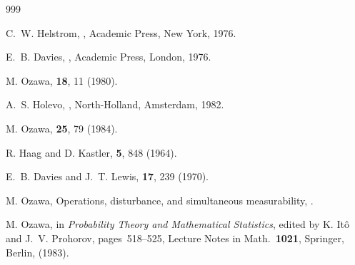 \begin{thebibliography}{999}

C.~W. Helstrom,
,
\newblock Academic Press, New York, 1976.

E.~B. Davies,
,
\newblock Academic Press, London, 1976.

M. Ozawa,
 {\bf 18}, 11 (1980).

A.~S. Holevo,
,
\newblock North-Holland, Amsterdam, 1982.

M. Ozawa,
 {\bf 25}, 79 (1984).

R. Haag and D. Kastler,
 {\bf 5}, 848 (1964).

E.~B. Davies and J.~T. Lewis,
 {\bf 17}, 239 (1970).

M. Ozawa,
\newblock Operations, disturbance, and simultaneous measurability,
.

M. Ozawa,
\newblock in  {\it Probability Theory
  and Mathematical Statistics}, edited by K. It\^{o} and J.~V. Prohorov,
pages~518--525,
Lecture Notes in Math.\ {\bf 1021}, Springer, Berlin, (1983).

\end{thebibliography}

 

